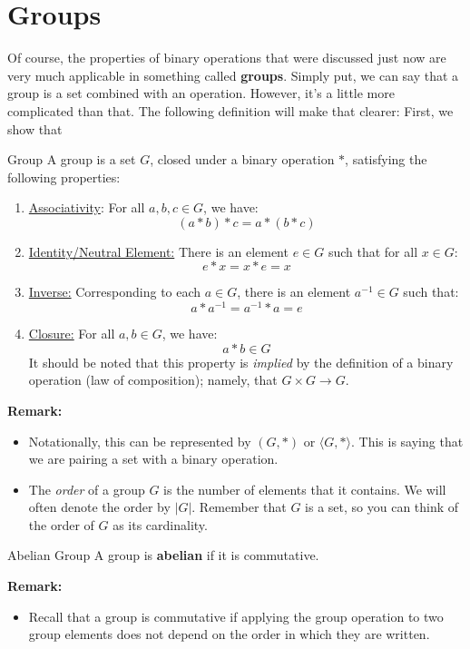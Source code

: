 \documentclass[letterpaper]{article}
\begin{document}
\section{Groups}
Of course, the properties of binary operations that were discussed just now are very much applicable in something called \textbf{groups}. Simply put, we can say that a group is a set combined with an operation. However, it's a little more complicated than that. The following definition will make that clearer:
First, we show that\begin{definition}{Group}{}
    A group is a set $G$, closed under a binary operation $*$, satisfying the following properties:
    \begin{enumerate}
        \item \underline{Associativity}: For all $a, b, c \in G$, we have:
        \[(a * b) * c = a * (b * c)\]

        \item \underline{Identity/Neutral Element:} There is an element $e \in G$ such that for all $x \in G$:
        \[e * x = x * e = x\]

        \item \underline{Inverse:} Corresponding to each $a \in G$, there is an element $a^{-1} \in G$ such that:
        \[a * a^{-1} = a^{-1} * a = e\]

        \item \underline{Closure:} For all $a, b \in G$, we have:
        \[a * b \in G\]
        It should be noted that this property is \emph{implied} by the definition of a binary operation (law of composition); namely, that $G \times G \to G$.  
    \end{enumerate}
\end{definition}
\textbf{Remark:}
\begin{itemize}
    \item Notationally, this can be represented by $(G, *)$ or $\langle G, * \rangle$. This is saying that we are pairing a set with a binary operation. 
    \item The \emph{order} of a group $G$ is the number of elements that it contains. We will often denote the order by $|G|$. Remember that $G$ is a set, so you can think of the order of $G$ as its cardinality. 
\end{itemize}

\begin{definition}{Abelian Group}{}
    A group is \textbf{abelian} if it is commutative.
\end{definition}
\textbf{Remark:}
\begin{itemize}
    \item Recall that a group is commutative if applying the group operation to two group elements does not depend on the order in which they are written. 
\end{itemize}
\end{document}
